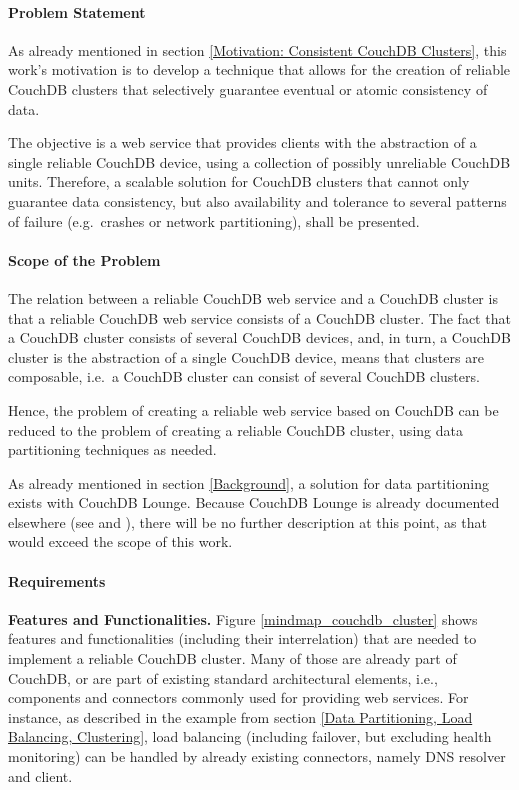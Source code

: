 \paragraph{Problem Statement}
As already mentioned in section \ref{Motivation: Consistent CouchDB Clusters}, this work's motivation is to develop a technique that allows for the creation of reliable CouchDB clusters that selectively guarantee eventual or atomic consistency of data.

The objective is a web service that provides clients with the abstraction of a single reliable CouchDB device, using a collection of possibly unreliable CouchDB units. Therefore, a scalable solution for CouchDB clusters that cannot only guarantee data consistency, but also availability and tolerance to several patterns of failure (e.g.\ crashes or network partitioning), shall be presented.

\paragraph{Scope of the Problem}
The relation between a reliable CouchDB web service and a CouchDB cluster is that a reliable CouchDB web service consists of a CouchDB cluster. The fact that a CouchDB cluster consists of several CouchDB devices, and, in turn, a CouchDB cluster is the abstraction of a single CouchDB device, means that clusters are composable, i.e.\ a CouchDB cluster can consist of several CouchDB clusters.

Hence, the problem of creating a reliable web service based on CouchDB can be reduced to the problem of creating a reliable CouchDB cluster, using data partitioning techniques as needed.

As already mentioned in section \ref{Background}, a solution for data partitioning exists with CouchDB Lounge. Because CouchDB Lounge is already documented elsewhere (see \cite{Lou10a} and \cite[p.~165]{ASL10}), there will be no further description at this point, as that would exceed the scope of this work.

\paragraph{Requirements}
\label{Requirements}
\noindent
{\bf Features and Functionalities.}
Figure \ref{mindmap_couchdb_cluster} shows features and functionalities (including their interrelation) that are needed to implement a reliable CouchDB cluster. Many of those are already part of CouchDB, or are part of existing standard architectural elements, i.e., components and connectors commonly used for providing web services. For instance, as described in the example from section \ref{Data Partitioning, Load Balancing, Clustering}, load balancing (including failover, but excluding health monitoring) can be handled by already existing connectors, namely DNS resolver and client.

